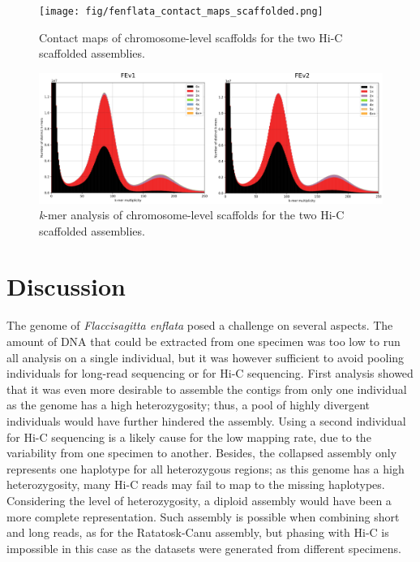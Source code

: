\begin{figure}[H]
    \centering
    \texttt{[image: fig/fenflata\_contact\_maps\_scaffolded.png]}
    \caption{Contact maps of chromosome-level scaffolds for the two Hi-C scaffolded assemblies.}
    \label{fig:fenflata_contact_maps}
\end{figure}

\begin{figure}[H]
    \centering
    \includegraphics[width=1\linewidth]{fig/fenflata_kat_scaffolded.eps}
    \caption{\textit{k}-mer analysis of chromosome-level scaffolds for the two Hi-C scaffolded assemblies.}
    \label{fig:fenflata_kat_comp}
\end{figure}

\section{Discussion}

The genome of \textit{Flaccisagitta enflata} posed a challenge on several aspects. The amount of DNA that could be extracted from one specimen was too low to run all analysis on a single individual, but it was however sufficient to avoid pooling individuals for long-read sequencing or for Hi-C sequencing. First analysis showed that it was even more desirable to assemble the contigs from only one individual as the genome has a high heterozygosity; thus, a pool of highly divergent individuals would have further hindered the assembly. Using a second individual for Hi-C sequencing is a likely cause for the low mapping rate, due to the variability from one specimen to another. Besides, the collapsed assembly only represents one haplotype for all heterozygous regions; as this genome has a high heterozygosity, many Hi-C reads may fail to map to the missing haplotypes. Considering the level of heterozygosity, a diploid assembly would have been a more complete representation. Such assembly is possible when combining short and long reads, as for the Ratatosk-Canu assembly, but phasing with Hi-C is impossible in this case as the datasets were generated from different specimens. \\


